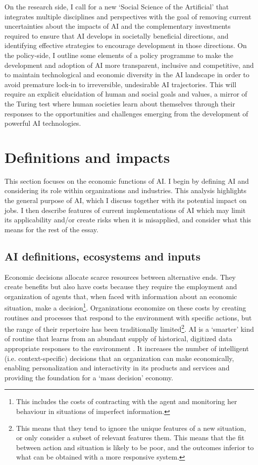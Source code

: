 \documentclass[11pt]{article}
\begin{document}
  On the research side, I call for a new `Social Science of the Artificial' that integrates multiple disciplines and perspectives with the goal of removing current uncertainties about the impacts of AI and the complementary investments required to ensure that AI develops in societally beneficial directions, and identifying effective strategies to encourage development in those directions. On the policy-side, I outline some elements of a policy programme to make the development and adoption of AI more transparent, inclusive and competitive, and to maintain technological and economic diversity in the AI landscape in order to avoid premature lock-in to irreversible, undesirable AI trajectories. This will require an explicit elucidation of human and social goals and values, a mirror of the Turing test where human societies learn about themselves through their responses to the opportunities and challenges emerging from the development of powerful AI technologies. 



\section{Definitions and impacts}
\label{sec:definition}

This section focuses on the economic functions of AI. I begin by defining AI and considering its role within organizations and industries. This analysis highlights the general purpose of AI, which I discuss together with its potential impact on jobs. I then describe features of current implementations of AI which may limit its applicability and/or create risks when it is misapplied, and consider what this means for the rest of the essay.

\subsection{AI definitions, ecosystems and inputs}
\label{subsec:systems}
Economic decisions allocate scarce resources between alternative ends. They create benefits but also have costs because they require the employment and organization of agents that, when faced with information about an economic situation, make a decision\footnote{This includes the costs of contracting with the agent and monitoring her behaviour in situations of imperfect information.}. Organizations economize on these costs by creating routines and processes that respond to the environment with specific actions, but the range of their repertoire has been traditionally limited\footnote{This means that they tend to ignore the unique features of a new situation, or only consider a subset of relevant features them. This means that the fit between action and situation is likely to be poor, and the outcomes inferior to what can be obtained with a more responsive system.}. AI is a `smarter' kind of routine that learns from an abundant supply of historical, digitized data appropriate responses to the environment . It increases the number of intelligent (i.e. context-specific) decisions that an organization can make economically, enabling personalization and interactivity in its products and services and providing the foundation for a `mass decision' economy.
\end{document}
